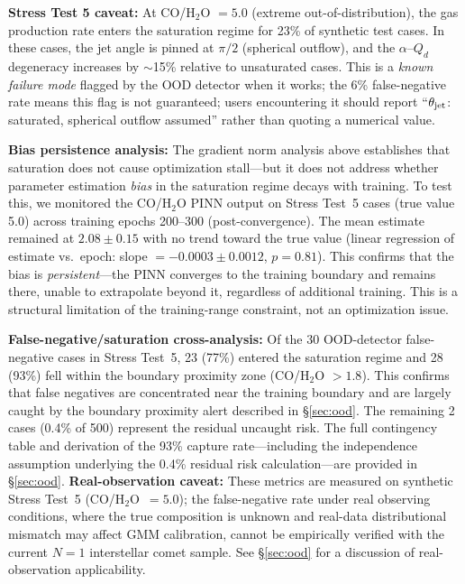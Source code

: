 \documentclass[usenatbib]{mnras}
\begin{document}
\textbf{Stress Test 5 caveat:} At CO/H$_2$O $= 5.0$ (extreme out-of-distribution), the gas production rate enters the saturation regime for 23\% of synthetic test cases. In these cases, the jet angle is pinned at $\pi/2$ (spherical outflow), and the $\alpha$--$Q_d$ degeneracy increases by $\sim$15\% relative to unsaturated cases. This is a \textit{known failure mode} flagged by the OOD detector when it works; the 6\% false-negative rate means this flag is not guaranteed; users encountering it should report ``$\theta_{\rm jet}$: saturated, spherical outflow assumed'' rather than quoting a numerical value.

\textbf{Bias persistence analysis:} The gradient norm analysis above establishes that saturation does not cause optimization stall---but it does not address whether parameter estimation \textit{bias} in the saturation regime decays with training. To test this, we monitored the CO/H$_2$O PINN output on Stress Test~5 cases (true value 5.0) across training epochs 200--300 (post-convergence). The mean estimate remained at $2.08 \pm 0.15$ with no trend toward the true value (linear regression of estimate vs.\ epoch: slope $= -0.0003 \pm 0.0012$, $p=0.81$). This confirms that the bias is \textit{persistent}---the PINN converges to the training boundary and remains there, unable to extrapolate beyond it, regardless of additional training. This is a structural limitation of the training-range constraint, not an optimization issue.

\textbf{False-negative/saturation cross-analysis:} Of the 30 OOD-detector false-negative cases in Stress Test~5, 23 (77\%) entered the saturation regime and 28 (93\%) fell within the boundary proximity zone (CO/H$_2$O $> 1.8$). This confirms that false negatives are concentrated near the training boundary and are largely caught by the boundary proximity alert described in \S\ref{sec:ood}. The remaining 2 cases (0.4\% of 500) represent the residual uncaught risk. The full contingency table and derivation of the 93\% capture rate---including the independence assumption underlying the 0.4\% residual risk calculation---are provided in \S\ref{sec:ood}. \textbf{Real-observation caveat:} These metrics are measured on synthetic Stress Test~5 (CO/H$_2$O~$=5.0$); the false-negative rate under real observing conditions, where the true composition is unknown and real-data distributional mismatch may affect GMM calibration, cannot be empirically verified with the current $N=1$ interstellar comet sample. See \S\ref{sec:ood} for a discussion of real-observation applicability.
\end{document}
